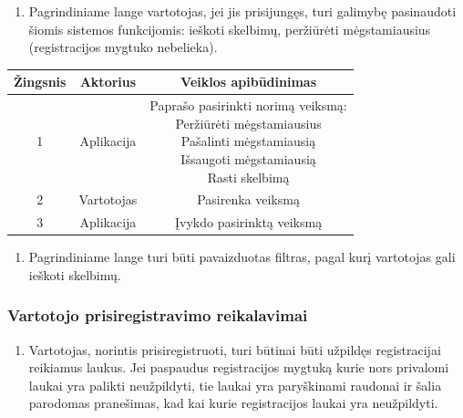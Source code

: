 \documentclass[12pt]{article}
\begin{document}
	\begin{enumerate}[resume, labelindent=10pt,leftmargin=2.2cm]
		\item Pagrindiniame lange vartotojas, jei jis prisijungęs, turi galimybę pasinaudoti šiomis sistemos funkcijomis: ieškoti skelbimų, peržiūrėti mėgstamiausius (registracijos mygtuko nebelieka).
	\end{enumerate}
		
		\begin{center}
		\begin{tabular}{ | c | c | c | }
			\hline
			Žingsnis & Aktorius   & Veiklos apibūdinimas \\ \hline
			1        & Aplikacija & \makecell{Paprašo pasirinkti norimą veiksmą: \\ Peržiūrėti mėgstamiausius \\ Pašalinti mėgstamiausią \\ Išsaugoti mėgstamiausią \\ Rasti skelbimą} \\ \hline
			2        & Vartotojas & Pasirenka veiksmą \\ \hline
			3        & Aplikacija & Įvykdo pasirinktą veiksmą \\ \hline
		\end{tabular}
		\bigskip
		\end{center}		
		
	\begin{enumerate}[resume, labelindent=10pt,leftmargin=2.2cm]
		\item Pagrindiniame lange turi būti pavaizduotas filtras, pagal kurį vartotojas gali ieškoti skelbimų.
	\end{enumerate}	
	\pagebreak
	
	\subsubsection{Vartotojo prisiregistravimo reikalavimai}
	\begin{enumerate}[labelindent=10pt,leftmargin=2.2cm]
		\item Vartotojas, norintis prisiregistruoti, turi būtinai būti užpildęs registracijai reikiamus laukus. Jei paspaudus registracijos mygtuką kurie nors privalomi laukai yra palikti neužpildyti, tie laukai yra paryškinami raudonai ir šalia parodomas pranešimas, kad kai kurie registracijos laukai yra neužpildyti.
	\end{enumerate}
		
\end{document}

